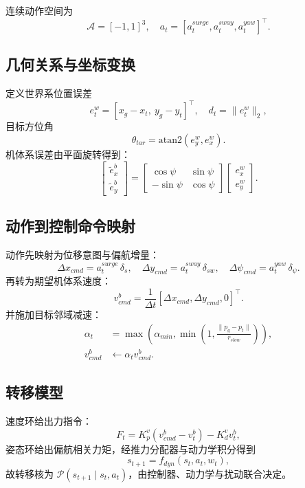 \documentclass[11pt]{article}
\begin{document}
连续动作空间为
\begin{equation}
\mathcal{A}=[-1,1]^3,\quad a_t=[a_t^{surge},a_t^{sway},a_t^{yaw}]^\top.
\end{equation}

\subsection*{几何关系与坐标变换}
定义世界系位置误差
\begin{equation}
e_t^w=[x_g-x_t,\ y_g-y_t]^\top,\quad d_t=\|e_t^w\|_2,
\end{equation}
目标方位角
\begin{equation}
\theta_{tar}=\mathrm{atan2}(e_y^w,e_x^w).
\end{equation}
机体系误差由平面旋转得到：
\begin{equation}
\begin{bmatrix}\tilde e_x^b\\ \tilde e_y^b\end{bmatrix}
=
\begin{bmatrix}
\cos\psi & \sin\psi\\
-\sin\psi & \cos\psi
\end{bmatrix}
\begin{bmatrix}e_x^w\\ e_y^w\end{bmatrix}.
\end{equation}

\subsection*{动作到控制命令映射}
动作先映射为位移意图与偏航增量：
\begin{equation}
\Delta x_{cmd}=a_t^{surge}\,\delta_s,\quad
\Delta y_{cmd}=a_t^{sway}\,\delta_{sw},\quad
\Delta\psi_{cmd}=a_t^{yaw}\,\delta_\psi.
\end{equation}
再转为期望机体系速度：
\begin{equation}
v_{cmd}^b=\frac{1}{\Delta t}[\Delta x_{cmd},\Delta y_{cmd},0]^\top.
\end{equation}
并施加目标邻域减速：
\begin{align}
\alpha_t &= \max\!\left(\alpha_{min},\min\!\left(1,\frac{\|p_g-p_t\|}{r_{slow}}\right)\right),\\
v_{cmd}^b &\leftarrow \alpha_t v_{cmd}^b.
\end{align}

\subsection*{转移模型}
速度环给出力指令：
\begin{equation}
F_t=K_p^v(v_{cmd}^b-v_t^b)-K_d^v v_t^b,
\end{equation}
姿态环给出偏航相关力矩，经推力分配器与动力学积分得到
\begin{equation}
s_{t+1}=f_{dyn}(s_t,a_t,w_t),
\end{equation}
故转移核为 $\mathcal{P}(s_{t+1}\mid s_t,a_t)$，由控制器、动力学与扰动联合决定。
\end{document}
